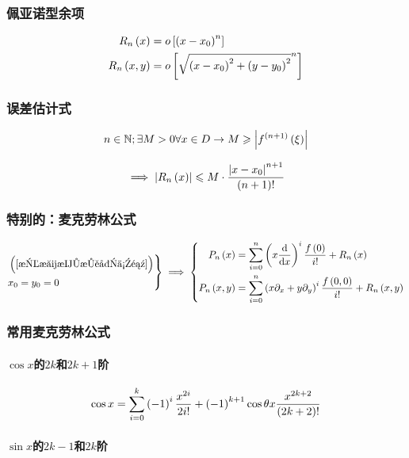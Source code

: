 \documentclass{article}
\begin{document}
\subsubsection{佩亚诺型余项}

\[\begin{aligned}
        R_n\left(x\right)    & =
        o\left[\left(x-x_0\right)^n\right] \\
        R_n\left(x,y\right) & =
        o\left[\sqrt{\left(x-x_0\right)^2+\left(y-y_0\right)^2}^n\right]
    \end{aligned}\]

\subsubsection{误差估计式}

\[n\in\mathbb N;\exists M>0\forall x\in D\to M\geqslant\left|f^{\left(n+1\right)}\left(\xi\right)\right|\]

\[\implies\left|R_n\left(x\right)\right|\leqslant M\cdot\frac{\left|x-x_0\right|^{n+1}}{\left(n+1\right)!}\]

\subsubsection{特别的：麦克劳林公式}

\[\left.\begin{aligned}
         & \left(\ref{拉格朗日型余项}\right) \\
         & x_0=y_0=0
    \end{aligned}\right\}
    \implies
    \left\{\begin{aligned}
        P_n\left(x\right)    & =\sum_{i=0}^n\left(x\frac{\mathrm d}{\mathrm d x}\right)^i\frac{f\left(0\right)}{i!}+R_n\left(x\right)              \\
        P_n\left(x,y\right) & =\sum_{i=0}^n\left(x\partial_x+y\partial_y\right)^i\frac{f\left(0,0\right)}{i!}+R_n\left(x,y\right)
    \end{aligned}\right.\]

\subsubsection{常用麦克劳林公式}

\paragraph{$\cos x$的$2k$和$2k+1$阶}

\[\cos x=\sum_{i=0}^k\left(-1\right)^i\frac{x^{2i}}{2i!}+\left(-1\right)^{k+1}\cos\theta x\frac{x^{2k+2}}{\left(2k+2\right)!}\]

\paragraph{$\sin x$的$2k-1$和$2k$阶}
\end{document}
